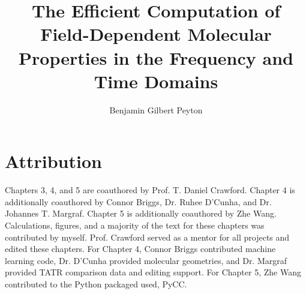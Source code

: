 \documentclass[doublespace]{VTthesis} %
\title{The Efficient Computation of Field-Dependent Molecular Properties in the Frequency and Time Domains}
\author{Benjamin Gilbert Peyton}
\begin{document}
  \frontmatter
  \maketitle
  \tableofcontents

	\listoffigures
	\listoftables

    \chapter*{Attribution}
Chapters 3, 4, and 5 are coauthored by Prof. T. Daniel Crawford. Chapter 4 is additionally coauthored
by Connor Briggs, Dr. Ruhee D'Cunha, and Dr. Johannes T. Margraf. Chapter 5 is additionally coauthored 
by Zhe Wang. 
Calculations, figures, and a majority of the text for these chapters was contributed by myself. Prof. Crawford served as a mentor for all projects and edited these chapters. For Chapter 4, Connor Briggs contributed 
machine learning code, Dr. D'Cunha provided molecular geometries, and Dr. Margraf provided TATR comparison data and editing support. For Chapter 5, Zhe Wang contributed to the Python packaged used, PyCC. 

	\mainmatter
    
    
    
    
    
    

    

      
	
%	   
\end{document}
